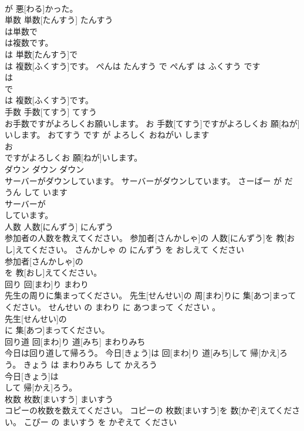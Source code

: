 \documentclass[8pt]{extreport}
\begin{document}
\begin{CJK}{UTF8}{min}
\\	が 悪[わる]かった。			
\\	単数	単数[たんすう]	たんすう	
\\	は単数で
\\	は複数です。	
\\	[ぺん]は 単数[たんすう]で 
\\	[ぺんず]は 複数[ふくすう]です。	ぺんは たんすう で ぺんず は ふくすう です	
\\	[ぺん]は
\\	で 
\\	[ぺんず]は 複数[ふくすう]です。			
\\	手数	手数[てすう]	てすう	
\\	お手数ですがよろしくお願いします。	お 手数[てすう]ですがよろしくお 願[ねが]いします。	おてすう です が よろしく おねがい します	
\\	お
\\	ですがよろしくお 願[ねが]いします。			
\\	ダウン	ダウン	ダウン	
\\	サーバーがダウンしています。	サーバーがダウンしています。	さーばー が だうん して います	
\\	サーバーが
\\	しています。			
\\	人数	人数[にんずう]	にんずう	
\\	参加者の人数を教えてください。	参加者[さんかしゃ]の 人数[にんずう]を 教[おし]えてください。	さんかしゃ の にんずう を おしえて ください	
\\	参加者[さんかしゃ]の
\\	を 教[おし]えてください。			
\\	回り	回[まわ]り	まわり	
\\	先生の周りに集まってください。	先生[せんせい]の 周[まわ]りに 集[あつ]まってください。	せんせい の まわり に あつまって ください 。	
\\	先生[せんせい]の
\\	に 集[あつ]まってください。			
\\	回り道	回[まわ]り 道[みち]	まわりみち	
\\	今日は回り道して帰ろう。	今日[きょう]は 回[まわ]り 道[みち]して 帰[かえ]ろう。	きょう は まわりみち して かえろう	
\\	今日[きょう]は
\\	して 帰[かえ]ろう。			
\\	枚数	枚数[まいすう]	まいすう	
\\	コピーの枚数を数えてください。	コピーの 枚数[まいすう]を 数[かぞ]えてください。	こぴー の まいすう を かぞえて ください	

\end{CJK}
\end{document}
